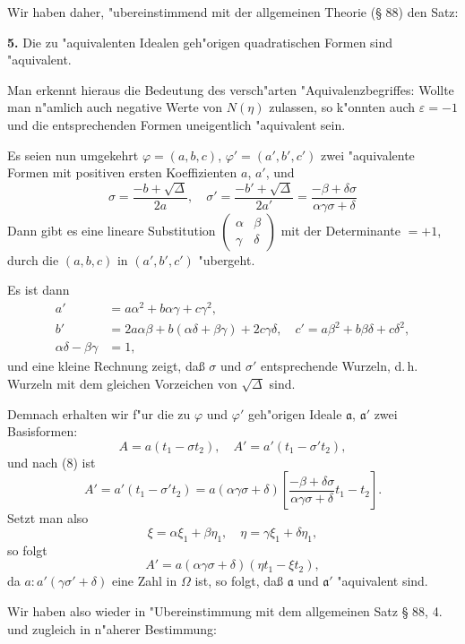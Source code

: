 \documentclass[12pt,a4paper]{article}
\theoremstyle{plain}
\begin{document}
Wir haben daher, "ubereinstimmend mit der allgemeinen Theorie (\S{} 88) den Satz:

\textbf{5.} Die zu "aquivalenten Idealen geh"origen quadratischen Formen sind "aquivalent.

Man erkennt hieraus die Bedeutung des versch"arten "Aquivalenzbegriffes: Wollte man n"amlich auch negative Werte von $N(\eta)$ zulassen, so k"onnten auch $\varepsilon = -1$ und die entsprechenden Formen uneigentlich "aquivalent sein.

Es seien nun umgekehrt $\varphi = (a, b, c)$, $\varphi' = (a', b', c')$ zwei "aquivalente Formen mit positiven ersten Koeffizienten $a$, $a'$, und
\begin{equation}
\sigma = \frac{-b + \sqrt{\Delta}}{2a},\quad \sigma' = \frac{-b' + \sqrt{\Delta}}{2a'} = \frac{-\beta + \delta\sigma}{\alpha\gamma\sigma + \delta}
\tag{6}
\end{equation}
Dann gibt es eine lineare Substitution $\begin{pmatrix} \alpha & \beta \\ \gamma & \delta \end{pmatrix}$ mit der Determinante $= +1$, durch die $(a, b, c)$ in $(a', b', c')$ "ubergeht.

Es ist dann
\begin{align*}
a' &= a\alpha^2 + b\alpha\gamma + c\gamma^2,\\
b' &= 2a\alpha\beta + b(\alpha\delta + \beta\gamma) + 2c\gamma\delta,\quad c' = a\beta^2 + b\beta\delta + c\delta^2,\\
\alpha\delta - \beta\gamma &= 1,
\end{align*}
und eine kleine Rechnung zeigt, da\ss{} $\sigma$ und $\sigma'$ entsprechende Wurzeln, d.\,h. Wurzeln mit dem gleichen Vorzeichen von $\sqrt{\Delta}$ sind.

Demnach erhalten wir f"ur die zu $\varphi$ und $\varphi'$ geh"origen Ideale $\mathfrak{a}$, $\mathfrak{a}'$ zwei Basisformen:
\[
A = a(t_1 - \sigma t_2),\quad A' = a'(t_1 - \sigma' t_2),
\]
und nach (8) ist
\[
A' = a'(t_1 - \sigma' t_2) = a(\alpha\gamma\sigma + \delta)\left[\frac{-\beta + \delta\sigma}{\alpha\gamma\sigma + \delta}t_1 - t_2\right].
\]
Setzt man also
\[
\xi = \alpha\xi_1 + \beta\eta_1,\quad \eta = \gamma\xi_1 + \delta\eta_1,
\]
so folgt
\[
A' = a(\alpha\gamma\sigma + \delta)(\eta t_1 - \xi t_2),
\]
da $a:a'(\gamma\sigma' + \delta)$ eine Zahl in $\Omega$ ist, so folgt, da\ss{} $\mathfrak{a}$ und $\mathfrak{a}'$ "aquivalent sind.

Wir haben also wieder in "Ubereinstimmung mit dem allgemeinen Satz \S{} 88, 4. und zugleich in n"aherer Bestimmung:
\end{document}
